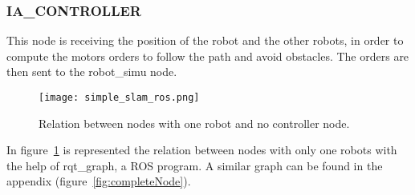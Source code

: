\subsubsection*{IA\_CONTROLLER}

This node is receiving the position of the robot and the other robots, in order to compute the motors orders to follow the path and avoid obstacles. The orders are then sent to the robot\_simu node.

\begin{figure}[H]
\centering
\texttt{[image: simple\_slam\_ros.png]}
\caption{Relation between nodes with one robot and no controller node.}
\label{fig:oneRobGraph}
\end{figure}

In figure~\ref{fig:oneRobGraph} is represented the relation between nodes with only one robots with the help of rqt\_graph, a ROS program. A  similar graph can be found in the appendix (figure~\ref{fig:completeNode}).